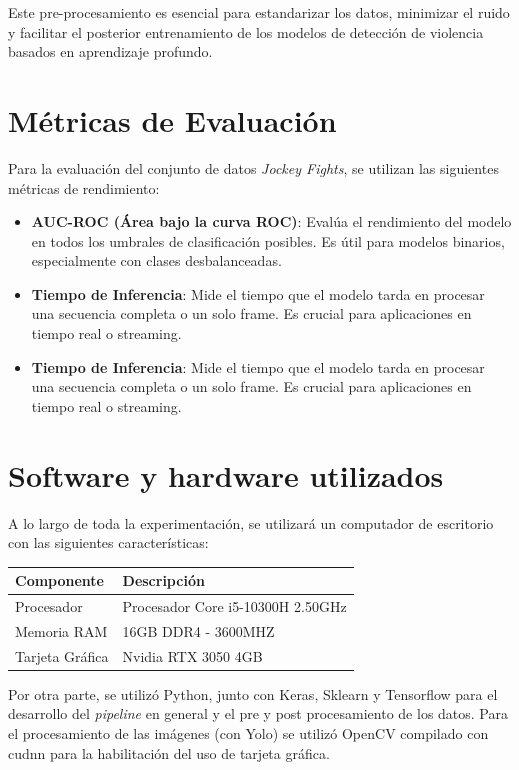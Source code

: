 Este pre-procesamiento es esencial para estandarizar 
los datos, minimizar el ruido y facilitar el posterior 
entrenamiento de los modelos de detección de violencia basados 
en aprendizaje profundo.

\section{Métricas de Evaluación}

Para la evaluación del conjunto de datos 
\textit{Jockey Fights}, se utilizan las siguientes 
métricas de rendimiento:

\begin{itemize}

    \item \textbf{AUC-ROC (Área bajo la curva ROC)}: Evalúa 
    el rendimiento del modelo en todos los umbrales de 
    clasificación posibles. Es útil para modelos binarios, 
    especialmente con clases desbalanceadas.
    
    \item \textbf{Tiempo de Inferencia}: Mide el tiempo que 
    el modelo tarda en procesar una secuencia completa o un 
    solo frame. Es crucial para aplicaciones en tiempo real 
    o streaming.

    \item \textbf{Tiempo de Inferencia}: Mide el tiempo que 
    el modelo tarda en procesar una secuencia completa o un solo frame. Es crucial para aplicaciones en tiempo real o streaming.
\end{itemize}

\section{Software y hardware utilizados}
A lo largo de toda la experimentación, se utilizará un computador de escritorio con las siguientes características:

\begin{table}[h!]
\centering
\footnotesize
\begin{tabular}{|l|l|}
\hline
\textbf{Componente} & \textbf{Descripción} \\ \hline
Procesador & Procesador	Core i5-10300H 2.50GHz\\ \hline
Memoria RAM & 16GB DDR4 - 3600MHZ \\ \hline
Tarjeta Gráfica & Nvidia RTX 3050 4GB \\ \hline
\end{tabular}
\end{table}

Por otra parte, se utilizó Python, junto con Keras, Sklearn y Tensorflow 
para el desarrollo del \textit{pipeline} en general y el pre y post 
procesamiento de los datos. Para el procesamiento de las imágenes (con Yolo) 
se utilizó OpenCV compilado con cudnn para la habilitación del uso de tarjeta gráfica. 
